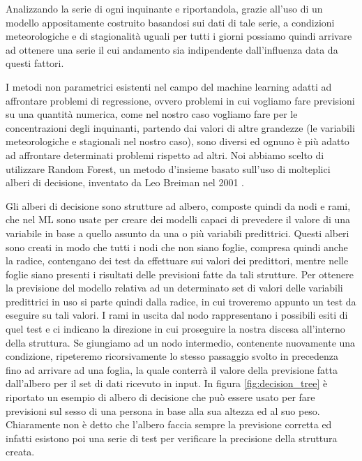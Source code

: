 \documentclass[a4paper]{report}
\begin{document}
Analizzando la serie di ogni inquinante e riportandola, grazie all'uso di un modello appositamente costruito basandosi sui dati di tale serie, a condizioni meteorologiche e di stagionalità uguali per tutti i giorni possiamo quindi arrivare ad ottenere una serie il cui andamento sia indipendente dall'influenza data da questi fattori.

I metodi non parametrici esistenti nel campo del machine learning adatti ad affrontare problemi di regressione, ovvero problemi in cui vogliamo fare previsioni su una quantità numerica, come nel nostro caso vogliamo fare per le concentrazioni degli inquinanti, partendo dai valori di altre grandezze (le variabili meteorologiche e stagionali nel nostro caso), sono diversi ed ognuno è più adatto ad affrontare determinati problemi rispetto ad altri. Noi abbiamo scelto di utilizzare Random Forest, un metodo d'insieme basato sull'uso di molteplici alberi di decisione, inventato da Leo Breiman nel 2001 \cite{breiman2001random}.

Gli alberi di decisione sono strutture ad albero, composte quindi da nodi e rami, che nel ML sono usate per creare dei modelli capaci di prevedere il valore di una variabile in base a quello assunto da una o più variabili predittrici. Questi alberi sono creati in modo che tutti i nodi che non siano foglie, compresa quindi anche la radice, contengano dei test da effettuare sui valori dei predittori, mentre nelle foglie siano presenti i risultati delle previsioni fatte da tali strutture. Per ottenere la previsione del modello relativa ad un determinato set di valori delle variabili predittrici in uso si parte quindi dalla radice, in cui troveremo appunto un test da eseguire su tali valori. I rami in uscita dal nodo rappresentano i possibili esiti di quel test e ci indicano la direzione in cui proseguire la nostra discesa all'interno della struttura. Se giungiamo ad un nodo intermedio, contenente nuovamente una condizione, ripeteremo ricorsivamente lo stesso passaggio svolto in precedenza fino ad arrivare ad una foglia, la quale conterrà il valore della previsione fatta dall'albero per il set di dati ricevuto in input.
In figura \ref{fig:decision_tree} è riportato un esempio di albero di decisione che può essere usato per fare previsioni sul sesso di una persona in base alla sua altezza ed al suo peso. Chiaramente non è detto che l'albero faccia sempre la previsione corretta ed infatti esistono poi una serie di test per verificare la precisione della struttura creata.
\end{document}
